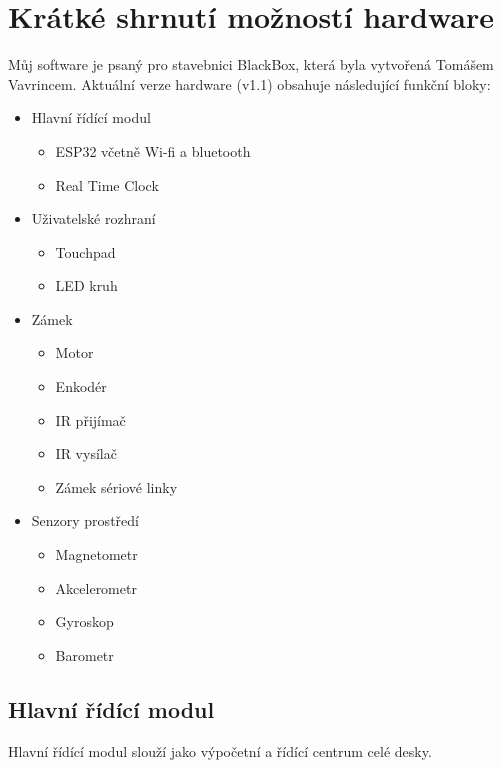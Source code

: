 \newpage
\chapter{Krátké shrnutí možností hardware}
Můj software je psaný pro stavebnici BlackBox, která byla vytvořená Tomášem Vavrincem.%
Aktuální verze hardware (v1.1) obsahuje následující funkční bloky:

\begin{itemize}[noitemsep]
    \item Hlavní řídící modul
        \begin{itemize}[noitemsep]
            \item ESP32 včetně Wi-fi a bluetooth
            \item Real Time Clock
        \end{itemize}
    \item Uživatelské rozhraní
        \begin{itemize}[noitemsep]
            \item Touchpad
            \item LED kruh
        \end{itemize}
    \item Zámek
        \begin{itemize}[noitemsep]
            \item Motor
            \item Enkodér
            \item IR přijímač
            \item IR vysílač
            \item Zámek sériové linky
        \end{itemize}
    \item Senzory prostředí
        \begin{itemize}[noitemsep]
            \item Magnetometr
            \item Akcelerometr
            \item Gyroskop
            \item Barometr
        \end{itemize}
\end{itemize}

\newpage
\section{Hlavní řídící modul}
Hlavní řídící modul slouží jako výpočetní a řídící centrum celé desky.

